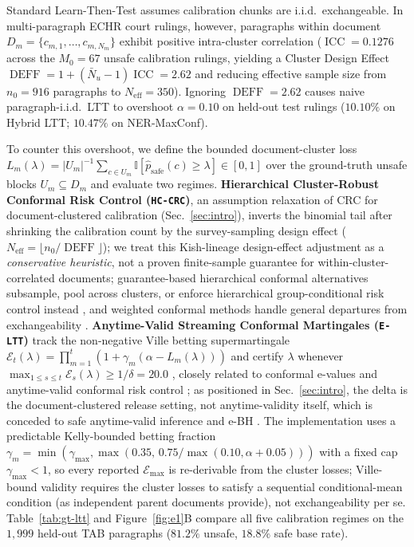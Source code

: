\documentclass{article}
\begin{document}
Standard Learn-Then-Test assumes calibration chunks are i.i.d.\ exchangeable. In multi-paragraph ECHR court rulings, however, paragraphs within document $D_m = \{c_{m,1},\dots,c_{m,N_m}\}$ exhibit positive intra-cluster correlation ($\operatorname{ICC} = 0.1276$ across the $M_0{=}67$ unsafe calibration rulings, yielding a Cluster Design Effect $\operatorname{DEFF} = 1 + (\bar{N}_u - 1)\operatorname{ICC} = \mathbf{2.62}$ and reducing effective sample size from $n_0{=}916$ paragraphs to $N_{\text{eff}}{=}350$). Ignoring $\operatorname{DEFF}{=}2.62$ causes naive paragraph-i.i.d.\ LTT to overshoot $\alpha{=}0.10$ on held-out test rulings ($10.10\%$ on Hybrid LTT; $10.47\%$ on NER-MaxConf).

To counter this overshoot, we define the bounded document-cluster loss $L_m(\lambda) = |U_m|^{-1} \sum_{c \in U_m} \mathbb{I}[\hat{p}_{\text{safe}}(c) \ge \lambda] \in [0, 1]$ over the ground-truth unsafe blocks $U_m \subseteq D_m$ and evaluate two regimes. \textbf{Hierarchical Cluster-Robust Conformal Risk Control (\texttt{HC-CRC})}, an assumption relaxation of CRC \citep{angelopoulos2023crc} for document-clustered calibration (Sec.~\ref{sec:intro}), inverts the binomial tail after shrinking the calibration count by the survey-sampling design effect ($N_{\text{eff}} = \lfloor n_0 / \operatorname{DEFF} \rfloor$); we treat this Kish-lineage design-effect adjustment as a \emph{conservative heuristic}, not a proven finite-sample guarantee for within-cluster-correlated documents; guarantee-based hierarchical conformal alternatives subsample, pool across clusters, or enforce hierarchical group-conditional risk control instead \citep{dunn2022hierarchical,lee2023hierarchical,salem2026hgcrc}, and weighted conformal methods handle general departures from exchangeability \citep{barber2023beyond}. \textbf{Anytime-Valid Streaming Conformal Martingales (\texttt{E-LTT})} track the non-negative Ville betting supermartingale $\mathcal{E}_t(\lambda) = \prod_{m=1}^t (1 + \gamma_m(\alpha - L_m(\lambda)))$ and certify $\lambda$ whenever $\max_{1 \le s \le t} \mathcal{E}_s(\lambda) \ge 1/\delta = 20.0$ \citep{ramdas2023game,waudbysmith2024betting}, closely related to conformal e-values and anytime-valid conformal risk control \citep{gauthier2025evalues,hultberg2026anytime}; as positioned in Sec.~\ref{sec:intro}, the delta is the document-clustered release setting, not anytime-validity itself, which is conceded to safe anytime-valid inference and e-BH \citep{ramdas2023game,wang2022ebh}. The implementation uses a predictable Kelly-bounded betting fraction $\gamma_m = \min(\gamma_{\max}, \max(0.35,\, 0.75/\max(0.10, \alpha + 0.05)))$ with a fixed cap $\gamma_{\max} < 1$, so every reported $\mathcal{E}_{\max}$ is re-derivable from the cluster losses; Ville-bound validity requires the cluster losses to satisfy a sequential conditional-mean condition (as independent parent documents provide), not exchangeability per se. Table~\ref{tab:gt-ltt} and Figure~\ref{fig:e1}B compare all five calibration regimes on the $1{,}999$ held-out TAB paragraphs ($81.2\%$ unsafe, $18.8\%$ safe base rate).
\end{document}
